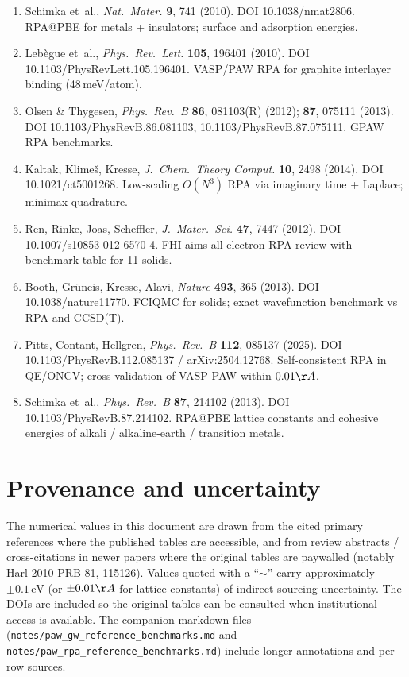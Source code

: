 \documentclass[11pt]{article}
\newcommand{\eV}{\ensuremath{\,\mathrm{eV}}}
\begin{document}
\begin{enumerate}
  \item Schimka et~al., \emph{Nat.\ Mater.} \textbf{9}, 741 (2010).
        DOI 10.1038/nmat2806. RPA@PBE for metals + insulators; surface
        and adsorption energies.

  \item Leb\`egue et~al., \emph{Phys.\ Rev.\ Lett.} \textbf{105},
        196401 (2010). DOI 10.1103/PhysRevLett.105.196401. VASP/PAW RPA
        for graphite interlayer binding (48\,meV/atom).

  \item Olsen \& Thygesen, \emph{Phys.\ Rev.\ B} \textbf{86}, 081103(R)
        (2012); \textbf{87}, 075111 (2013). DOI
        10.1103/PhysRevB.86.081103, 10.1103/PhysRevB.87.075111.
        GPAW RPA benchmarks.

  \item Kaltak, Klime\v{s}, Kresse, \emph{J.\ Chem.\ Theory Comput.}
        \textbf{10}, 2498 (2014). DOI 10.1021/ct5001268. Low-scaling
        $O(N^3)$ RPA via imaginary time + Laplace; minimax quadrature.

  \item Ren, Rinke, Joas, Scheffler, \emph{J.\ Mater.\ Sci.} \textbf{47},
        7447 (2012). DOI 10.1007/s10853-012-6570-4. FHI-aims all-electron
        RPA review with benchmark table for 11 solids.

  \item Booth, Gr\"{u}neis, Kresse, Alavi, \emph{Nature} \textbf{493},
        365 (2013). DOI 10.1038/nature11770. FCIQMC for solids; exact
        wavefunction benchmark vs RPA and CCSD(T).

  \item Pitts, Contant, Hellgren, \emph{Phys.\ Rev.\ B} \textbf{112},
        085137 (2025). DOI 10.1103/PhysRevB.112.085137 / arXiv:2504.12768.
        Self-consistent RPA in QE/ONCV; cross-validation of VASP PAW
        within $0.01\AA$.

  \item Schimka et~al., \emph{Phys.\ Rev.\ B} \textbf{87}, 214102 (2013).
        DOI 10.1103/PhysRevB.87.214102. RPA@PBE lattice constants and
        cohesive energies of alkali / alkaline-earth / transition metals.
\end{enumerate}

\section{Provenance and uncertainty}

The numerical values in this document are drawn from the cited primary
references where the published tables are accessible, and from review
abstracts / cross-citations in newer papers where the original tables
are paywalled (notably Harl 2010 PRB 81, 115126). Values quoted with a
``$\sim$'' carry approximately $\pm 0.1\eV$ (or $\pm 0.01\AA$ for lattice
constants) of indirect-sourcing uncertainty. The DOIs are included so
the original tables can be consulted when institutional access is
available. The companion markdown files
(\texttt{notes/paw\_gw\_reference\_benchmarks.md} and
\texttt{notes/paw\_rpa\_reference\_benchmarks.md}) include longer
annotations and per-row sources.
\end{document}
